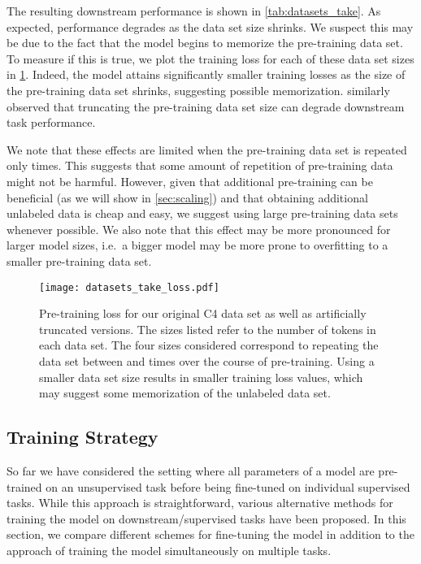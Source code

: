 \documentclass[twoside,11pt]{article}
\begin{document}
The resulting downstream performance is shown in \cref{tab:datasets_take}.
As expected, performance degrades as the data set size shrinks.
We suspect this may be due to the fact that the model begins to memorize the pre-training data set.
To measure if this is true, we plot the training loss for each of these data set sizes in \cref{fig:datasets_take_loss}.
Indeed, the model attains significantly smaller training losses as the size of the pre-training data set shrinks, suggesting possible memorization.
\citet{baevski2019cloze} similarly observed that truncating the pre-training data set size can degrade downstream task performance.

We note that these effects are limited when the pre-training data set is repeated only  times.
This suggests that some amount of repetition of pre-training data might not be harmful.
However, given that additional pre-training can be beneficial (as we will show in \cref{sec:scaling}) and that obtaining additional unlabeled data is cheap and easy, we suggest using large pre-training data sets whenever possible.
We also note that this effect may be more pronounced for larger model sizes, i.e.\ a bigger model may be more prone to overfitting to a smaller pre-training data set.

\begin{figure}[t]
    \centering
    \texttt{[image: datasets\_take\_loss.pdf]}
    \caption{
    Pre-training loss for our original C4 data set as well as  artificially truncated versions.
    The sizes listed refer to the number of tokens in each data set.
    The four sizes considered correspond to repeating the data set between  and  times over the course of pre-training.
    Using a smaller data set size results in smaller training loss values, which may suggest some memorization of the unlabeled data set.
}
    \label{fig:datasets_take_loss}
\end{figure}

\subsection{Training Strategy}
\label{sec:transfer}

So far we have considered the setting where all parameters of a model are pre-trained on an unsupervised task before being fine-tuned on individual supervised tasks.
While this approach is straightforward, various alternative methods for training the model on downstream/supervised tasks have been proposed.
In this section, we compare different schemes for fine-tuning the model in addition to the approach of training the model simultaneously on multiple tasks.
\end{document}
